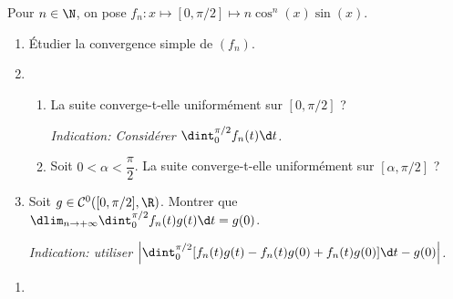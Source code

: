 \begin{enonce}
\begin{exercise}[ID={RMS134 E1489},subtitle={CCINP MP 2023},theme={analyse},concours={ccinp},annee={2023},filiere={MP}]
  Pour $n\in\N$, on pose $f_n:x\mapsto[0,\pi/2]\mapsto n\cos^n(x)\sin(x)$.
 \begin{enumerate}
  \item Étudier la convergence simple de $(f_n)$.
  \item
    \begin{enumerate}
    \item La suite converge-t-elle uniformément sur $[0,\pi/2]$ ?
      
      {\itshape Indication: Considérer $\dint_0^{\pi/2}f_n(t)\d t$.}
    \item Soit $0<\alpha<\dfrac{\pi}2$. La suite converge-t-elle
      uniformément sur $[\alpha,\pi/2]$ ?
    \end{enumerate}
  \item Soit $g\in\mathcal{C}^0([0,\pi/2],\R)$. Montrer que
    $\dlim_{n\to +\infty}\dint_0^{\pi/2} f_n(t)g(t)\d t=g(0)$.

    {\itshape Indication: utiliser
      $\left|\dint_0^{\pi/2}[f_n(t)g(t)-f_n(t)g(0)+f_n(t)g(0)]
        \d t-g(0)\right|$.}
  \end{enumerate}
\end{exercise}
\begin{solution}
  \begin{enumerate}
  \item 
  \end{enumerate}
\end{solution}
\end{enonce}